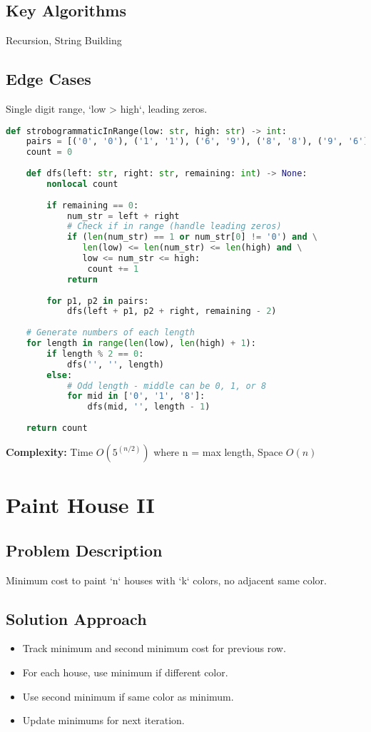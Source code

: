 \documentclass[10pt, a4paper]{article}
\begin{document}
\subsection*{Key Algorithms}
Recursion, String Building

\subsection*{Edge Cases}
Single digit range, `low > high`, leading zeros.

\begin{lstlisting}[language=Python]
def strobogrammaticInRange(low: str, high: str) -> int:
    pairs = [('0', '0'), ('1', '1'), ('6', '9'), ('8', '8'), ('9', '6')]
    count = 0
    
    def dfs(left: str, right: str, remaining: int) -> None:
        nonlocal count
        
        if remaining == 0:
            num_str = left + right
            # Check if in range (handle leading zeros)
            if (len(num_str) == 1 or num_str[0] != '0') and \
               len(low) <= len(num_str) <= len(high) and \
               low <= num_str <= high:
                count += 1
            return
        
        for p1, p2 in pairs:
            dfs(left + p1, p2 + right, remaining - 2)
    
    # Generate numbers of each length
    for length in range(len(low), len(high) + 1):
        if length % 2 == 0:
            dfs('', '', length)
        else:
            # Odd length - middle can be 0, 1, or 8
            for mid in ['0', '1', '8']:
                dfs(mid, '', length - 1)
    
    return count
\end{lstlisting}
\textbf{Complexity:} Time $O(5^{(n/2)})$ where n = max length, Space $O(n)$

\section{Paint House II}
\subsection*{Problem Description}
Minimum cost to paint `n` houses with `k` colors, no adjacent same color.

\subsection*{Solution Approach}
\begin{itemize}
    \item Track minimum and second minimum cost for previous row.
    \item For each house, use minimum if different color.
    \item Use second minimum if same color as minimum.
    \item Update minimums for next iteration.
\end{itemize}
\end{document}
